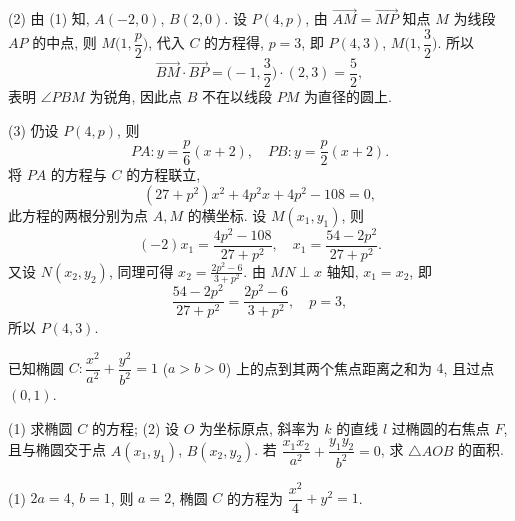     (2) 由 (1) 知, $A(-2,0)$, $B(2,0)$. 设 $P(4,p)$, 由 $\overrightarrow{AM}= \overrightarrow{MP}$ 知点 $M$ 为线段 $AP$ 的中点, 则 $M\biggl(1,\dfrac{p}2\biggr)$, 代入 $C$ 的方程得, $p=3$, 即 $P(4,3)$, $M\biggl(1,\dfrac32\biggr)$. 所以
    \[\overrightarrow{BM}\cdot \overrightarrow{BP}
    = \biggl(-1,\frac32\biggr)\cdot (2,3)= \frac52,\]
    表明 $\angle PBM$ 为锐角, 因此点 $B$ 不在以线段 $PM$ 为直径的圆上.

    (3) 仍设 $P(4,p)$, 则
    \[PA\colon y= \frac{p}6(x+2),\quad
    PB\colon y= \frac{p}2(x+2).\]
    将 $PA$ 的方程与 $C$ 的方程联立,
    \[(27+p^2)x^2+ 4p^2x+ 4p^2-108= 0,\]
    此方程的两根分别为点 $A,M$ 的横坐标. 设 $M(x_1,y_1)$, 则
    \[(-2)x_1= \frac{4p^2-108}{27+p^2},\quad
    x_1= \frac{54-2p^2}{27+p^2}.\]
    又设 $N(x_2,y_2)$, 同理可得 $x_2= \frac{2p^2-6}{3+p^2}$. 由 $MN\perp x$ 轴知, $x_1=x_2$, 即
    \[\frac{54-2p^2}{27+p^2}= \frac{2p^2-6}{3+p^2},\quad
    p=3,\]
    所以 $P(4,3)$.
\endsolution
    
\lianxi
\begin{exercise}[s]
    已知椭圆 $C\colon \dfrac{x^2}{a^2}+\dfrac{y^2}{b^2}=1$ ($a>b>0$) 上的点到其两个焦点距离之和为 $4$, 且过点 $(0, 1)$.
    
    (1) 求椭圆 $C$ 的方程;\qquad
    (2) 设 $O$ 为坐标原点, 斜率为 $k$ 的直线 $l$ 过椭圆的右焦点 $F$, 且与椭圆交于点 $A(x_1, y_1)$, $B(x_2, y_2)$. 若 $\dfrac{x_1x_2}{a^2}+ \dfrac{y_1y_2}{b^2}=0$, 求 $\triangle AOB$ 的面积.
\end{exercise}
\beginsolution
    (1) $2a=4$, $b=1$, 则 $a=2$, 椭圆 $C$ 的方程为 $\dfrac{x^2}4+ y^2= 1$.

